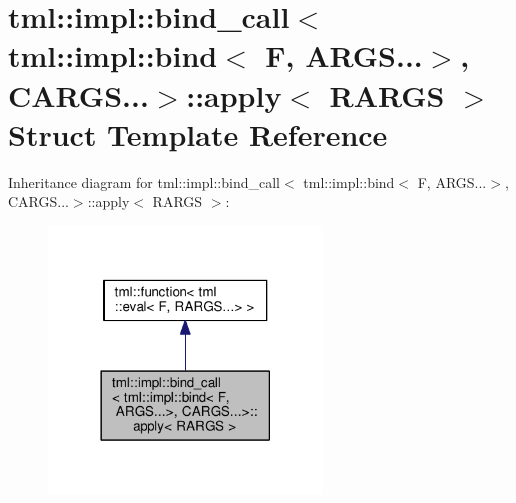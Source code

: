 \hypertarget{structtml_1_1impl_1_1bind__call_3_01tml_1_1impl_1_1bind_3_01_f_00_01_a_r_g_s_8_8_8_4_00_01_c_a_r_g_s_8_8_8_4_1_1apply}{\section{tml\+:\+:impl\+:\+:bind\+\_\+call$<$ tml\+:\+:impl\+:\+:bind$<$ F, A\+R\+G\+S...$>$, C\+A\+R\+G\+S...$>$\+:\+:apply$<$ R\+A\+R\+G\+S $>$ Struct Template Reference}
\label{structtml_1_1impl_1_1bind__call_3_01tml_1_1impl_1_1bind_3_01_f_00_01_a_r_g_s_8_8_8_4_00_01_c_a_r_g_s_8_8_8_4_1_1apply}
}


Inheritance diagram for tml\+:\+:impl\+:\+:bind\+\_\+call$<$ tml\+:\+:impl\+:\+:bind$<$ F, A\+R\+G\+S...$>$, C\+A\+R\+G\+S...$>$\+:\+:apply$<$ R\+A\+R\+G\+S $>$\+:
\nopagebreak
\begin{figure}[H]
\begin{center}
\leavevmode
\includegraphics[width=206pt]{structtml_1_1impl_1_1bind__call_3_01tml_1_1impl_1_1bind_3_01_f_00_01_a_r_g_s_8_8_8_4_00_01_c_a_r6f7d12aeb3d13bb6c56628a896ed640f}
\end{center}
\end{figure}


